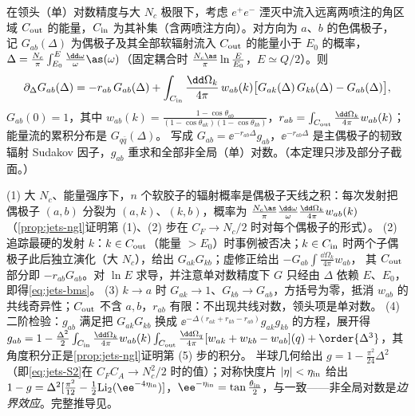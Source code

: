 \begin{theorem}\label{thm:jets-bms}
在领头（单）对数精度与大 $N_c$ 极限下，考虑 $e^+e^-$ 湮灭中流入远离两喷注的角区域 $C_{\rm out}$ 的能量，$C_{\rm in}$ 为其补集（含两喷注方向）。对方向为 $a$、$b$ 的色偶极子，
记 $G_{ab}(\Delta)$ 为偶极子及其全部软辐射流入 $C_{\rm out}$ 的能量小于 $E_0$ 的概率，$\Delta=\frac{N_c}{\pi}\int_{E_0}^{E}\frac{\dd\omega}{\omega}\as(\omega)$（固定耦合时 $\frac{N_c\as}{\pi}\ln\frac{E}{E_0}$，$E\simeq Q/2$）。则
\begin{equation}\label{eq:jets-bms}
\partial_\Delta G_{ab}(\Delta)=-r_{ab}\,G_{ab}(\Delta)+\int_{C_{\rm in}}\frac{\dd\Omega_k}{4\pi}\,w_{ab}(k)\big[G_{ak}(\Delta)\,G_{kb}(\Delta)-G_{ab}(\Delta)\big],
\end{equation}
$G_{ab}(0)=1$，其中 $w_{ab}(k)=\frac{1-\cos\theta_{ab}}{(1-\cos\theta_{ak})(1-\cos\theta_{kb})}$，$r_{ab}=\int_{C_{\rm out}}\frac{\dd\Omega_k}{4\pi}w_{ab}(k)$；能量流的累积分布是 $G_{q\bar q}(\Delta)$。
写成 $G_{ab}=\ee^{-r_{ab}\Delta}g_{ab}$，$\ee^{-r_{ab}\Delta}$ 是主偶极子的韧致辐射 Sudakov 因子，$g_{ab}$ 重求和全部非全局（单）对数。（本定理只涉及部分子截面。）
\end{theorem}

\begin{proofsketch}
(1) 大 $N_c$、能量强序下，$n$ 个软胶子的辐射概率是偶极子天线之积\cite[式~(3.3)、(3.4)]{Banfi:2002hw}：每次发射把偶极子 $(a,b)$ 分裂为 $(a,k)$、$(k,b)$，概率为 $\frac{N_c\as}{\pi}\frac{\dd\omega}{\omega}\frac{\dd\Omega_k}{4\pi}w_{ab}(k)$（\cref{prop:jets-ngl}证明第 (1)、(2) 步在 $C_F\to N_c/2$ 时对每个偶极子的形式）。
(2) 追踪最硬的发射 $k$：$k\in C_{\rm out}$（能量 $>E_0$）时事例被否决；$k\in C_{\rm in}$ 时两个子偶极子此后独立演化（大 $N_c$），给出 $G_{ak}G_{kb}$；虚修正给出 $-G_{ab}\int\frac{\dd\Omega_k}{4\pi}w_{ab}$，
其 $C_{\rm out}$ 部分即 $-r_{ab}G_{ab}$。对 $\ln E$ 求导，并注意单对数精度下 $G$ 只经由 $\Delta$ 依赖 $E$、$E_0$，即得\cref{eq:jets-bms}。
(3) $k\to a$ 时 $G_{ak}\to1$、$G_{kb}\to G_{ab}$，方括号为零，抵消 $w_{ab}$ 的共线奇异性；$C_{\rm out}$ 不含 $a,b$，$r_{ab}$ 有限：不出现共线对数，领头项是单对数。
(4) 二阶检验：$g_{ab}$ 满足把 $G_{ak}G_{kb}$ 换成 $\ee^{-\Delta(r_{ak}+r_{kb}-r_{ab})}g_{ak}g_{kb}$ 的方程，展开得
$g_{ab}=1-\frac{\Delta^2}{2}\int_{C_{\rm in}}\frac{\dd\Omega_k}{4\pi}w_{ab}(k)\int_{C_{\rm out}}\frac{\dd\Omega_q}{4\pi}[w_{ak}+w_{kb}-w_{ab}](q)+\order{\Delta^3}$，其角度积分正是\cref{prop:jets-ngl}证明第 (5) 步的积分。
半球几何给出 $g=1-\frac{\pi^2}{24}\Delta^2$（即\cref{eq:jets-S2}在 $C_FC_A\to N_c^2/2$ 时的值）；对称快度片 $|\eta|<\eta_{\rm in}$ 给出
$1-g=\Delta^2[\frac{\pi^2}{12}-\frac12\mathrm{Li}_2(\ee^{-4\eta_{\rm in}})]$，$\ee^{-\eta_{\rm in}}=\tan\frac{\theta_{\rm in}}{2}$，与\cite[式~(5.5)]{Banfi:2002hw}一致——非全局对数是\emph{边界效应}。完整推导见\cite[第~4~节]{Banfi:2002hw}。
\end{proofsketch}

